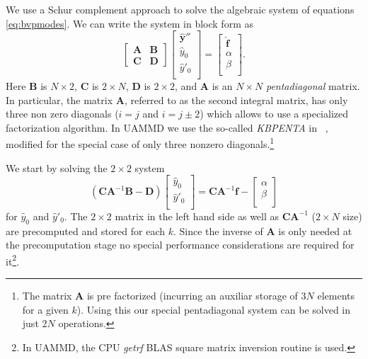\documentclass[ twoside,openright,titlepage,numbers=noenddot,%
headinclude,footinclude,cleardoublepage=empty,abstract=on,
BCOR=5mm,paper=b5,fontsize=11pt, dvipsnames
]{scrreprt}
\newcommand{\uammd}{\gls{UAMMD}\xspace}
\newcommand{\fou}[1]{\widehat{#1}}
\begin{document}
We use a Schur complement approach to solve the algebraic system of equations \eqref{eq:bvpmodes}. We can write the system in block form as 
\begin{equation}
\label{eq:blocksys}
\begin{bmatrix} \bm{A} & \bm{B} \\[2 pt] \bm{C} & \bm{D} \end{bmatrix}
\begin{bmatrix} \fou{\bm{y}}''\\ \fou{y}_0 \\ \fou{y}'_0 \\ \end{bmatrix}
= \begin{bmatrix}  \fou{\bm{f}}\\ \alpha \\ \beta\\ \end{bmatrix}. 
\end{equation}
Here $\bm{B}$ is $N \times 2$, $\bm{C}$ is $2 \times N$, $\bm{D}$ is $2 \times 2$, and $\bm{A}$ is an $N \times N$ \textit{pentadiagonal} matrix. In particular, the matrix $\bm{A}$, referred to as the second integral matrix, has only three non zero diagonals ($i=j$ and $i = j\pm 2$) which allows to use a specialized factorization algorithm. In \uammd we use the so-called \emph{KBPENTA} in ~\cite{Karawia2010}, modified for the special case of only three nonzero diagonals.\footnote{The matrix $\bm{A}$ is pre factorized (incurring an auxiliar storage of $3N$ elements for a given $k$). Using this our special pentadiagonal system can be solved in just $2N$ operations.} 

We start by solving the $2 \times 2$ system
\begin{equation}
(\bm{C}\bm{A}^{-1}\bm{B}-\bm{D})\begin{bmatrix}  \fou{y}_0 \\ \fou{y}'_0\\ \end{bmatrix} = \bm{C}\bm{A}^{-1}\bm{f}-\begin{bmatrix}  \alpha \\ \beta\\ \end{bmatrix}
\end{equation}
for $\fou{y}_0$ and $\fou{y}'_0$. The $2\times 2$ matrix in the left hand side as well as $\bm{C}\bm{A}^{-1}$ ($2\times N$ size) are precomputed and stored for each $k$. Since the inverse of $\bm{A}$ is only needed at the precomputation stage no special performance considerations are required for it\footnote{In \uammd, the CPU \emph{getrf} BLAS square matrix inversion routine is used.}.
\end{document}
